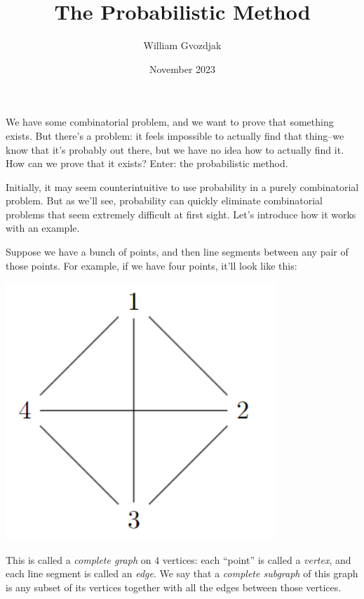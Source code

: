 \documentclass{article}
\title{The Probabilistic Method}
\author{William Gvozdjak}
\date{November 2023}
\begin{document}
\maketitle

We have some combinatorial problem, and we want to prove that something exists. But there's a problem: it feels impossible to actually find that thing--we know that it's probably out there, but we have no idea how to actually find it. How can we prove that it exists? Enter: the probabilistic method.

Initially, it may seem counterintuitive to use probability in a purely combinatorial problem. But as we'll see, probability can quickly eliminate combinatorial problems that seem extremely difficult at first sight. Let's introduce how it works with an example.

Suppose we have a bunch of points, and then line segments between any pair of those points. For example, if we have four points, it'll look like this:

\begin{center}
    \includegraphics[width=4in]{images/K4.png}
\end{center}

This is called a \emph{complete graph} on $4$ vertices: each ``point'' is called a \emph{vertex}, and each line segment is called an \emph{edge}. We say that a \emph{complete subgraph} of this graph is any subset of its vertices together with all the edges between those vertices.
\end{document}
